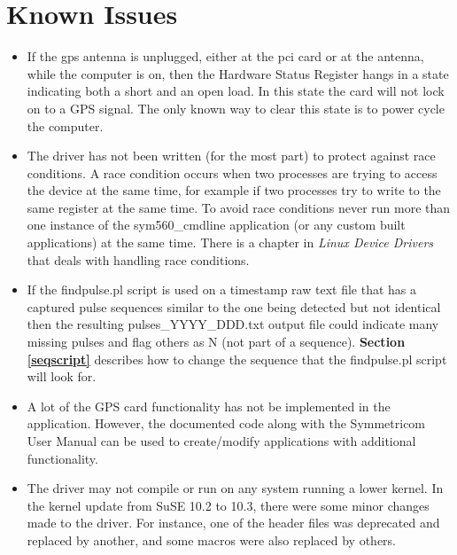 \documentclass[11pt]{article}
\begin{document}


\section{Known Issues} \label{issues}

\begin{itemize}
 \item If the gps antenna is unplugged, either at the pci card or at the antenna, while the computer is on, then the Hardware Status Register hangs in a state indicating both a short and an open load.  In this state the card will not lock on to a GPS signal. The only known way to clear this state is to power cycle the computer.

 \item The driver has not been written (for the most part) to protect against race conditions.  A race condition occurs when two processes are trying to access the device at the same time, for example if two processes try to write to the same register at the same time.  To avoid race conditions never run more than one instance of the sym560\_cmdline application (or any custom built applications) at the same time.  There is a chapter in \textit{Linux Device Drivers} that deals with handling race conditions.

 \item If the findpulse.pl script is used on a timestamp raw text file that has a captured pulse sequences similar to the one being detected but not identical then the resulting pulses\_YYYY\_DDD.txt output file could indicate many missing pulses and flag others as N (not part of a sequence).  \textbf{Section \ref{seqscript}} describes how to change the sequence that the findpulse.pl script will look for.

 \item A lot of the GPS card functionality has not be implemented in the application.  However, the documented code along with the Symmetricom User Manual can be used to create/modify applications with additional functionality.

 \item The driver may not compile or run on any system running a lower kernel.  In the kernel update from SuSE 10.2 to 10.3, there were some minor changes made to the driver.  For instance, one of the header files was deprecated and replaced by another, and some macros were also replaced by others.
\end{itemize}
\end{document}
